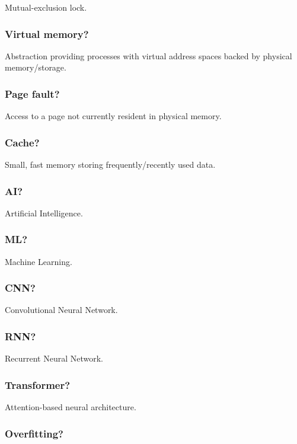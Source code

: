 Mutual-exclusion lock.

\subsubsection{Virtual memory?}

Abstraction providing processes with virtual address spaces backed by physical memory/storage.

\subsubsection{Page fault?}

Access to a page not currently resident in physical memory.

\subsubsection{Cache?}

Small, fast memory storing frequently/recently used data.

\subsubsection{AI?}

Artificial Intelligence.

\subsubsection{ML?}

Machine Learning.

\subsubsection{CNN?}

Convolutional Neural Network.

\subsubsection{RNN?}

Recurrent Neural Network.

\subsubsection{Transformer?}

Attention-based neural architecture.

\subsubsection{Overfitting?}

